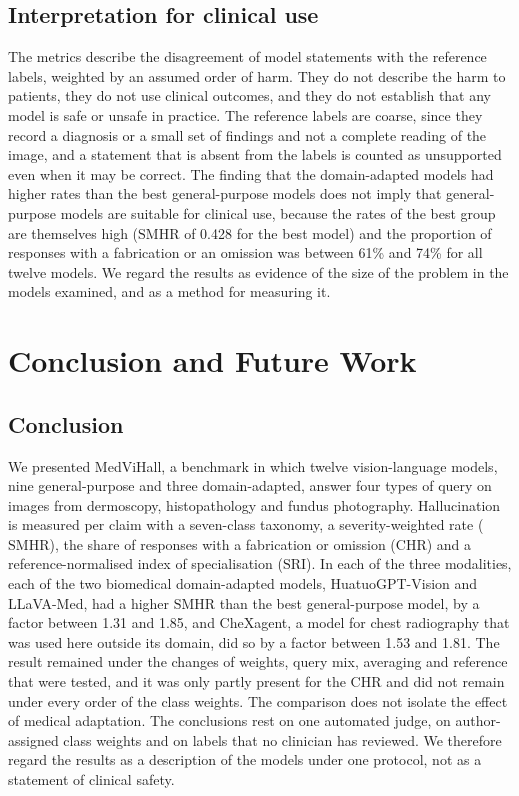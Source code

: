 \documentclass[11pt,a4paper]{article}
\newcommand{\SMHR}{\ensuremath{\mathrm{SMHR}}}
\newcommand{\CHR}{\ensuremath{\mathrm{CHR}}}
\newcommand{\SRI}{\ensuremath{\mathrm{SRI}}}
\begin{document}
\subsection{Interpretation for clinical use}\label{sec:disc_clinical}
The metrics describe the disagreement of model statements with the reference labels, weighted by an assumed order of harm. They do not describe the harm to patients, they do not use clinical outcomes, and they do not establish that any model is safe or unsafe in practice. The reference labels are coarse, since they record a diagnosis or a small set of findings and not a complete reading of the image, and a statement that is absent from the labels is counted as unsupported even when it may be correct. The finding that the domain-adapted models had higher rates than the best general-purpose models does not imply that general-purpose models are suitable for clinical use, because the rates of the best group are themselves high (\SMHR{} of 0.428 for the best model) and the proportion of responses with a fabrication or an omission was between 61\% and 74\% for all twelve models. We regard the results as evidence of the size of the problem in the models examined, and as a method for measuring it.

\section{Conclusion and Future Work}\label{sec:conclusion}

\subsection{Conclusion}
We presented MedViHall, a benchmark in which twelve vision-language models, nine general-purpose and three domain-adapted, answer four types of query on images from dermoscopy, histopathology and fundus photography. Hallucination is measured per claim with a seven-class taxonomy, a severity-weighted rate (\SMHR{}), the share of responses with a fabrication or omission (\CHR{}) and a reference-normalised index of specialisation (\SRI{}). In each of the three modalities, each of the two biomedical domain-adapted models, HuatuoGPT-Vision and LLaVA-Med, had a higher \SMHR{} than the best general-purpose model, by a factor between 1.31 and 1.85, and CheXagent, a model for chest radiography that was used here outside its domain, did so by a factor between 1.53 and 1.81. The result remained under the changes of weights, query mix, averaging and reference that were tested, and it was only partly present for the \CHR{} and did not remain under every order of the class weights. The comparison does not isolate the effect of medical adaptation. The conclusions rest on one automated judge, on author-assigned class weights and on labels that no clinician has reviewed. We therefore regard the results as a description of the models under one protocol, not as a statement of clinical safety.
\end{document}
